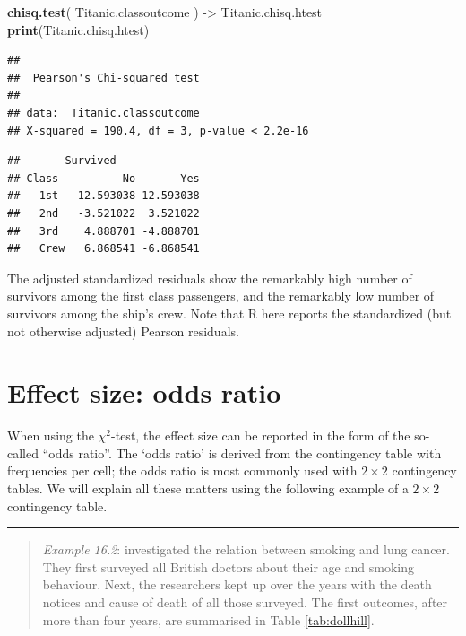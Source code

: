 \documentclass[
]{book}
\newenvironment{Shaded}{\begin{snugshade}}{\end{snugshade}}
\newcommand{\CommentTok}[1]{\textcolor[rgb]{0.56,0.35,0.01}{\textit{#1}}}
\newcommand{\FunctionTok}[1]{\textcolor[rgb]{0.13,0.29,0.53}{\textbf{#1}}}
\newcommand{\NormalTok}[1]{#1}
\newcommand{\OtherTok}[1]{\textcolor[rgb]{0.56,0.35,0.01}{#1}}
\newcommand{\SpecialCharTok}[1]{\textcolor[rgb]{0.81,0.36,0.00}{\textbf{#1}}}
\begin{document}
\begin{Shaded}
\begin{Highlighting}[]
\FunctionTok{chisq.test}\NormalTok{( Titanic.classoutcome ) }\OtherTok{{-}\textgreater{}}\NormalTok{ Titanic.chisq.htest}
\FunctionTok{print}\NormalTok{(Titanic.chisq.htest)}
\end{Highlighting}
\end{Shaded}

\begin{verbatim}
## 
##  Pearson's Chi-squared test
## 
## data:  Titanic.classoutcome
## X-squared = 190.4, df = 3, p-value < 2.2e-16
\end{verbatim}

\begin{Shaded}
\end{Shaded}

\begin{verbatim}
##       Survived
## Class          No       Yes
##   1st  -12.593038 12.593038
##   2nd   -3.521022  3.521022
##   3rd    4.888701 -4.888701
##   Crew   6.868541 -6.868541
\end{verbatim}

The adjusted standardized residuals show the remarkably high number of survivors among the first class passengers, and the remarkably low number of survivors among the ship's crew.
Note that R here reports the standardized (but not otherwise adjusted) Pearson residuals.

\section{Effect size: odds ratio}\label{effect-size-odds-ratio}

When using the \(\chi^2\)-test, the effect size can be reported in the form
of the so-called ``odds ratio''. The `odds ratio' is derived from the contingency
table with frequencies per cell; the odds ratio is most commonly used with \(2 \times 2\) contingency tables.
We will explain all these matters using the following example of a \(2 \times 2\) contingency table.

\begin{center}\rule{0.5\linewidth}{0.5pt}\end{center}

\begin{quote}
\emph{Example 16.2}:
\citet{DollHill1956} investigated the relation between smoking
and lung cancer. They first surveyed all British doctors about
their age and smoking behaviour. Next, the researchers kept up over the years with
the death notices and cause of death of all those surveyed. The first
outcomes, after more than four years, are summarised in
Table \ref{tab:dollhill}.
\end{quote}
\end{document}
